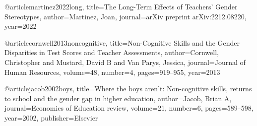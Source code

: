 @article{martinez2022long,
  title={The Long-Term Effects of Teachers' Gender Stereotypes},
  author={Martinez, Joan},
  journal={arXiv preprint arXiv:2212.08220},
  year={2022}
}

@article{cornwell2013noncognitive,
  title={Non-Cognitive Skills and the Gender Disparities in Test Scores and Teacher Assessments},
  author={Cornwell, Christopher and Mustard, David B and Van Parys, Jessica},
  journal={Journal of Human Resources},
  volume={48},
  number={4},
  pages={919--955},
  year={2013}
}

@article{jacob2002boys,
  title={Where the boys aren't: Non-cognitive skills, returns to school and the gender gap in higher education},
  author={Jacob, Brian A},
  journal={Economics of Education review},
  volume={21},
  number={6},
  pages={589--598},
  year={2002},
  publisher={Elsevier}
}
